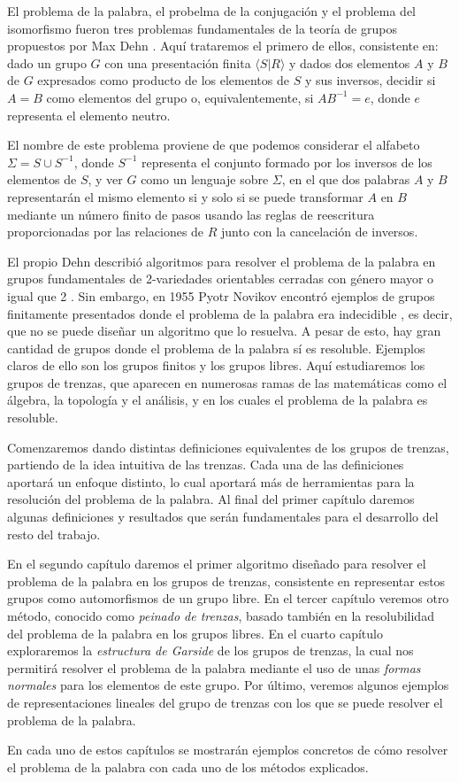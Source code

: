 \documentclass[TFG.tex]{subfiles}
\begin{document}

El problema de la palabra, el probelma de la conjugación y el problema del isomorfismo fueron tres problemas fundamentales de la teoría de grupos propuestos por Max Dehn \cite{Dehn11}. Aquí trataremos el primero de ellos, consistente en: dado un grupo $G$ con una presentación finita $\langle S| R\rangle$ y dados dos elementos $A$ y $B$ de $G$ expresados como producto de los elementos de $S$ y sus inversos, decidir si $A=B$ como elementos del grupo o, equivalentemente, si $AB^{-1}=e$, donde $e$ representa el elemento neutro.

El nombre de este problema proviene de que podemos considerar el alfabeto $\Sigma=S\cup S^{-1}$, donde $S^{-1}$ representa el conjunto formado por los inversos de los elementos de $S$, y ver $G$ como un lenguaje sobre $\Sigma$, en el que dos palabras $A$ y $B$ representarán el mismo elemento si y solo si se puede transformar $A$ en $B$ mediante un número finito de pasos usando las reglas de reescritura proporcionadas por las relaciones de $R$ junto con la cancelación de inversos.  

El propio Dehn describió algoritmos para resolver el problema de la palabra en grupos fundamentales de 2-variedades orientables cerradas con género mayor o igual que 2 \cite{Dehn12}. Sin embargo, en 1955 Pyotr Novikov encontró ejemplos de grupos finitamente presentados donde el problema de la palabra era indecidible \cite{Novikov}, es decir, que no se puede diseñar un algoritmo que lo resuelva. A pesar de esto, hay gran cantidad de grupos donde el problema de la palabra sí es resoluble. Ejemplos claros de ello son los grupos finitos y los grupos libres. Aquí estudiaremos los grupos de trenzas, que aparecen en numerosas ramas de las matemáticas como el álgebra, la topología y el análisis, y en los cuales el problema de la palabra es resoluble.

Comenzaremos dando distintas definiciones equivalentes de los grupos de trenzas, partiendo de la idea intuitiva de las trenzas. Cada una de las definiciones aportará un enfoque distinto, lo cual aportará más de herramientas para la resolución del problema de la palabra. Al final del primer capítulo daremos algunas definiciones y resultados que serán fundamentales para el desarrollo del resto del trabajo. 

En el segundo capítulo daremos el primer algoritmo diseñado para resolver el problema de la palabra en los grupos de trenzas, consistente en representar estos grupos como automorfismos de un grupo libre. En el tercer capítulo veremos otro método, conocido como \emph{peinado de trenzas}, basado también en la resolubilidad del problema de la palabra en los grupos libres. En el cuarto capítulo exploraremos la \emph{estructura de Garside} de los grupos de trenzas, la cual nos permitirá resolver el problema de la palabra mediante el uso de unas \emph{formas normales} para los elementos de este grupo. Por último, veremos algunos ejemplos de representaciones lineales del grupo de trenzas con los que se puede resolver el problema de la palabra. 

En cada uno de estos capítulos se mostrarán ejemplos concretos de cómo resolver el problema de la palabra con cada uno de los métodos explicados. 
\end{document}
